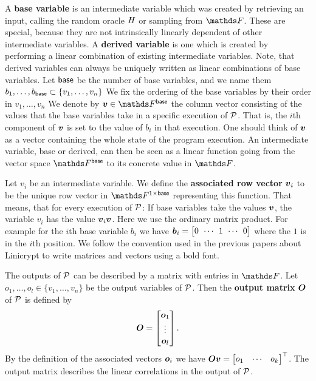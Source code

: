 A \textbf{base variable} is an intermediate variable which was created by retrieving an input,
calling the random oracle $\H$ or sampling from $\F$.
These are special, because they are not intrinsically linearly dependent of other intermediate variables.
A \textbf{derived variable} is one which is created by performing a linear combination of existing intermediate variables.
Note, that derived variables can always be uniquely written as linear combinations of base variables.
Let $\base$ be the number of base variables,
and we name them $\dts b \base \subset \{\dts v n\}$
We fix the ordering of the base variables by their order in $v_1, \dots, v_n$
We denote by $\vbase \in \Base$ the column vector
consisting of the values that the base variables take in a specific execution of $\P$.
That is, the $i$th component of $\vbase$ is set to the value of $b_i$ in that execution.
One should think of $\vbase$ as a vector containing the whole state of the program execution.
An intermediate variable, base or derived,
can then be seen as a linear function going from the vector space $\Fsp$ to its concrete value in $\F$.

Let $v_i$ be an intermediate variable.
We define the \textbf{associated row vector} $\v v_i$ to be the unique row vector in $\Frowsp$ representing this function.
That means, that for every execution of $\P$:
If base variables take the values $\vbase$,
the variable $v_i$ has the value $\vv_i \vbase$.
Here we use the ordinary matrix product.
For example for the $i$th base variable $b_i$ we have 
$\v b_i = \m{0 & \cdots & 1 & \cdots & 0}$
where the $1$ is in the $i$th position.
We follow the convention used in the previous papers about Linicrypt to write matrices and vectors using a bold font.

The outputs of $\P$ can be described by a matrix with entries in $\F$.
Let $o_1, \dots, o_l \in \{v_1, \dots, v_n \}$ be the output variables of $\P$.
Then the \textbf{output matrix} $\O$ of $\P$ is defined by
\[
  \O =
  \begin{bmatrix}
  \v o_1\\
  \vdots \\
  \v o_l
  \end{bmatrix}.
\]
By the definition of the associated vectors $\v o_i$ we have
$
\O \vbase = 
  \begin{bmatrix} o_1 & \cdots & o_k \end{bmatrix}^\top
$.
The output matrix describes the linear correlations in the output of $\P$.

